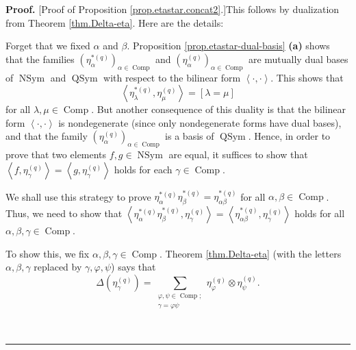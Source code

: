 \documentclass[numbers=enddot,12pt,final,onecolumn,notitlepage]{scrartcl}%
\theoremstyle{definition}
\newenvironment{proof}[1][Proof]{\noindent\textbf{#1.} }{\ \rule{0.5em}{0.5em}}
\let\sumnonlimits\sum
\renewcommand{\sum}{\sumnonlimits\limits}
\begin{document}
\begin{proof}
[Proof of Proposition \ref{prop.etastar.concat2}.]This follows by dualization
from Theorem \ref{thm.Delta-eta}. Here are the details:

Forget that we fixed $\alpha$ and $\beta$. Proposition
\ref{prop.etastar-dual-basis} \textbf{(a)} shows that the families $\left(
\eta_{\alpha}^{\ast\left(  q\right)  }\right)  _{\alpha\in\operatorname*{Comp}%
}$ and $\left(  \eta_{\alpha}^{\left(  q\right)  }\right)  _{\alpha
\in\operatorname*{Comp}}$ are mutually dual bases of $\operatorname*{NSym}$
and $\operatorname*{QSym}$ with respect to the bilinear form $\left\langle
\cdot,\cdot\right\rangle $. This shows that%
\begin{equation}
\left\langle \eta_{\lambda}^{\ast\left(  q\right)  },\eta_{\mu}^{\left(
q\right)  }\right\rangle =\left[  \lambda=\mu\right]
\label{pf.prop.etastar.concat2.duality}%
\end{equation}
for all $\lambda,\mu\in\operatorname*{Comp}$. But another consequence of this
duality is that the bilinear form $\left\langle \cdot,\cdot\right\rangle $ is
nondegenerate (since only nondegenerate forms have dual bases), and that the
family $\left(  \eta_{\alpha}^{\left(  q\right)  }\right)  _{\alpha
\in\operatorname*{Comp}}$ is a basis of $\operatorname*{QSym}$. Hence, in
order to prove that two elements $f,g\in\operatorname*{NSym}$ are equal, it
suffices to show that $\left\langle f,\eta_{\gamma}^{\left(  q\right)
}\right\rangle =\left\langle g,\eta_{\gamma}^{\left(  q\right)  }\right\rangle
$ holds for each $\gamma\in\operatorname*{Comp}$.

We shall use this strategy to prove $\eta_{\alpha}^{\ast\left(  q\right)
}\eta_{\beta}^{\ast\left(  q\right)  }=\eta_{\alpha\beta}^{\ast\left(
q\right)  }$ for all $\alpha,\beta\in\operatorname*{Comp}$. Thus, we need to
show that $\left\langle \eta_{\alpha}^{\ast\left(  q\right)  }\eta_{\beta
}^{\ast\left(  q\right)  },\eta_{\gamma}^{\left(  q\right)  }\right\rangle
=\left\langle \eta_{\alpha\beta}^{\ast\left(  q\right)  },\eta_{\gamma
}^{\left(  q\right)  }\right\rangle $ holds for all $\alpha,\beta,\gamma
\in\operatorname*{Comp}$.

To show this, we fix $\alpha,\beta,\gamma\in\operatorname*{Comp}$. Theorem
\ref{thm.Delta-eta} (with the letters $\alpha,\beta,\gamma$ replaced by
$\gamma,\varphi,\psi$) says that%
\[
\Delta\left(  \eta_{\gamma}^{\left(  q\right)  }\right)  =\sum
_{\substack{\varphi,\psi\in\operatorname*{Comp};\\\gamma=\varphi\psi}%
}\eta_{\varphi}^{\left(  q\right)  }\otimes\eta_{\psi}^{\left(  q\right)  }.
\]



\end{proof}
\end{document}
